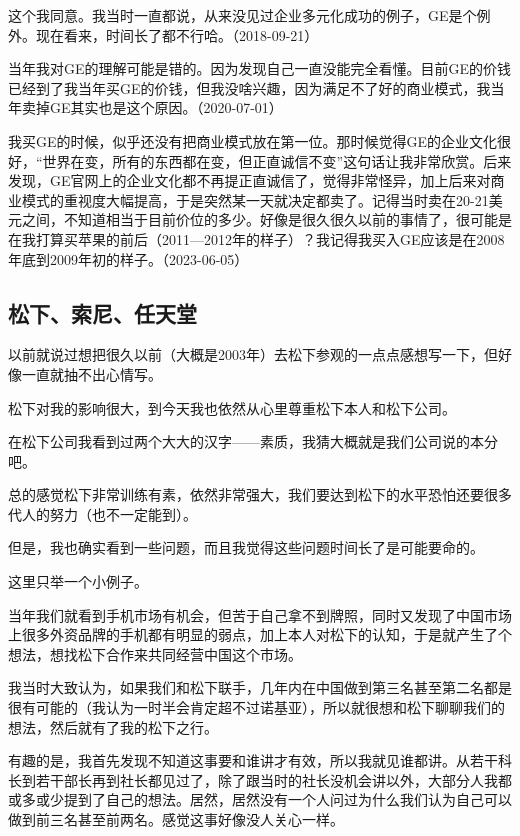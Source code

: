 
这个我同意。我当时一直都说，从来没见过企业多元化成功的例子，GE是个例外。现在看来，时间长了都不行哈。（2018-09-21）

当年我对GE的理解可能是错的。因为发现自己一直没能完全看懂。目前GE的价钱已经到了我当年买GE的价钱，但我没啥兴趣，因为满足不了好的商业模式，我当年卖掉GE其实也是这个原因。（2020-07-01）

我买GE的时候，似乎还没有把商业模式放在第一位。那时候觉得GE的企业文化很好，“世界在变，所有的东西都在变，但正直诚信不变”这句话让我非常欣赏。后来发现，GE官网上的企业文化都不再提正直诚信了，觉得非常怪异，加上后来对商业模式的重视度大幅提高，于是突然某一天就决定都卖了。记得当时卖在20-21美元之间，不知道相当于目前价位的多少。好像是很久很久以前的事情了，很可能是在我打算买苹果的前后（2011—2012年的样子）？我记得我买入GE应该是在2008年底到2009年初的样子。（2023-06-05）

\subsection{松下、索尼、任天堂}


以前就说过想把很久以前（大概是2003年）去松下参观的一点点感想写一下，但好像一直就抽不出心情写。

松下对我的影响很大，到今天我也依然从心里尊重松下本人和松下公司。

在松下公司我看到过两个大大的汉字——素质，我猜大概就是我们公司说的本分吧。

总的感觉松下非常训练有素，依然非常强大，我们要达到松下的水平恐怕还要很多代人的努力（也不一定能到）。

但是，我也确实看到一些问题，而且我觉得这些问题时间长了是可能要命的。

这里只举一个小例子。

当年我们就看到手机市场有机会，但苦于自己拿不到牌照，同时又发现了中国市场上很多外资品牌的手机都有明显的弱点，加上本人对松下的认知，于是就产生了个想法，想找松下合作来共同经营中国这个市场。

我当时大致认为，如果我们和松下联手，几年内在中国做到第三名甚至第二名都是很有可能的（我认为一时半会肯定超不过诺基亚），所以就很想和松下聊聊我们的想法，然后就有了我的松下之行。

有趣的是，我首先发现不知道这事要和谁讲才有效，所以我就见谁都讲。从若干科长到若干部长再到社长都见过了，除了跟当时的社长没机会讲以外，大部分人我都或多或少提到了自己的想法。居然，居然没有一个人问过为什么我们认为自己可以做到前三名甚至前两名。感觉这事好像没人关心一样。

